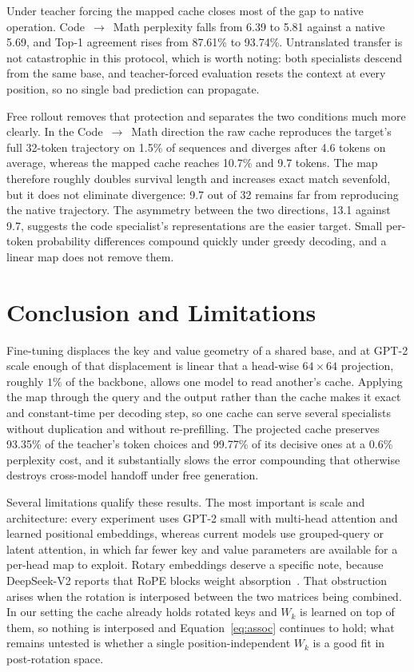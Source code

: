 \documentclass[11pt]{article}
\begin{document}
Under teacher forcing the mapped cache closes most of the gap to native operation.
Code~$\rightarrow$~Math perplexity falls from 6.39 to 5.81 against a native 5.69, and Top-1
agreement rises from 87.61\% to 93.74\%. Untranslated transfer is not catastrophic in this
protocol, which is worth noting: both specialists descend from the same base, and
teacher-forced evaluation resets the context at every position, so no single bad prediction
can propagate.

Free rollout removes that protection and separates the two conditions much more clearly. In
the Code~$\rightarrow$~Math direction the raw cache reproduces the target's full 32-token
trajectory on 1.5\% of sequences and diverges after 4.6 tokens on average, whereas the
mapped cache reaches 10.7\% and 9.7 tokens. The map therefore roughly doubles survival
length and increases exact match sevenfold, but it does not eliminate divergence: 9.7 out of
32 remains far from reproducing the native trajectory. The asymmetry between the two
directions, 13.1 against 9.7, suggests the code specialist's representations are the easier
target. Small per-token probability differences compound quickly under greedy decoding, and
a linear map does not remove them.

\section{Conclusion and Limitations}
\label{sec:limits}

Fine-tuning displaces the key and value geometry of a shared base, and at GPT-2 scale enough
of that displacement is linear that a head-wise $64 \times 64$ projection, roughly $1\%$ of
the backbone, allows one model to read another's cache. Applying the map through the query
and the output rather than the cache makes it exact and constant-time per decoding step, so
one cache can serve several specialists without duplication and without re-prefilling. The
projected cache preserves 93.35\% of the teacher's token choices and 99.77\% of its decisive
ones at a 0.6\% perplexity cost, and it substantially slows the error compounding that
otherwise destroys cross-model handoff under free generation.

Several limitations qualify these results. The most important is scale and architecture:
every experiment uses GPT-2 small with multi-head attention and learned positional
embeddings, whereas current models use grouped-query or latent attention, in which far fewer
key and value parameters are available for a per-head map to exploit. Rotary embeddings
deserve a specific note, because DeepSeek-V2 reports that RoPE blocks weight
absorption~\cite{deepseekv2}. That obstruction arises when the rotation is interposed
between the two matrices being combined. In our setting the cache already holds rotated
keys and $W_k$ is learned on top of them, so nothing is interposed and
Equation~\eqref{eq:assoc} continues to hold; what remains untested is whether a single
position-independent $W_k$ is a good fit in post-rotation space.
\end{document}
